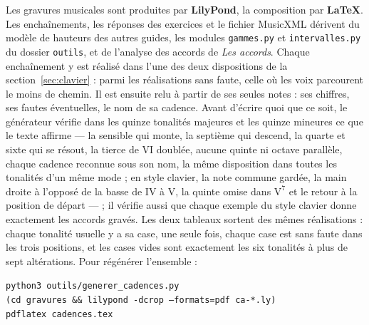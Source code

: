 \documentclass[a4paper,11pt]{article}
\newcommand{\ch}[3]{\ensuremath{\mathrm{#1}^{#2}_{#3}}}
\begin{document}
Les gravures musicales sont produites par \textbf{LilyPond}, la composition
par \textbf{\LaTeX}. Les enchaînements, les réponses des exercices et le
fichier MusicXML dérivent du modèle de hauteurs des autres guides, les modules
\texttt{gammes.py} et \texttt{intervalles.py} du dossier \texttt{outils}, et
de l'analyse des accords de \emph{Les accords}. Chaque enchaînement y est
réalisé dans l'une des deux dispositions de la section~\ref{sec:clavier} :
parmi les réalisations sans faute, celle où les voix parcourent le moins de
chemin. Il est ensuite relu à partir de ses seules notes : ses chiffres, ses
fautes éventuelles, le nom de sa cadence. Avant d'écrire quoi que ce soit, le
générateur vérifie dans les quinze tonalités majeures et les quinze mineures
ce que le texte affirme --- la sensible qui monte, la septième qui descend, la
quarte et sixte qui se résout, la tierce de VI doublée, aucune quinte ni
octave parallèle, chaque cadence reconnue sous son nom, la même disposition
dans toutes les tonalités d'un même mode ; en style clavier, la note commune
gardée, la main droite à l'opposé de la basse de IV à V, la quinte omise dans
\ch{V}{7}{} et le retour à la position de départ --- ; il vérifie aussi que
chaque exemple du style clavier donne exactement les accords gravés. Les deux
tableaux sortent des mêmes réalisations : chaque tonalité usuelle y a sa case,
une seule fois, chaque case est sans faute dans les trois positions, et les
cases vides sont exactement les six tonalités à plus de sept altérations. Pour
régénérer l'ensemble :

\begin{center}
\texttt{python3 outils/generer\_cadences.py}\\
\texttt{(cd gravures \&\& lilypond -dcrop --formats=pdf ca-*.ly)}\\
\texttt{pdflatex cadences.tex}
\end{center}
\end{document}
